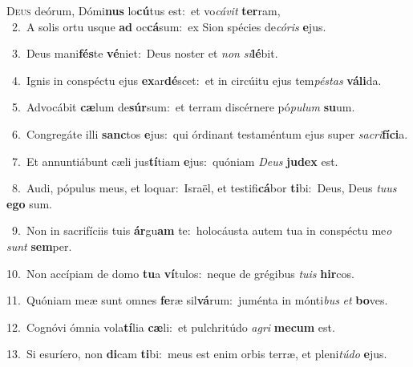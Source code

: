 \lettrine{\initial\textcolor{\initialcolor}{D}}{eus} deórum, Dómi\textbf{nus} lo\-\textbf{cú}\-tus est:~\star et vo\-\textit{cá}\-\textit{vit} \textbf{ter}\-ram,\\
{\numbfont\textcolor{\numbcolor}{~2.}}~A solis ortu usque \textbf{ad} oc\-\textbf{cá}\-sum:~\star ex Sion spécies de\-\textit{có}\-\textit{ris} \textbf{e}\-jus.\par
{\numbfont\textcolor{\numbcolor}{~3.}}~Deus mani\-\textbf{fés}\-te \textbf{vé}\-niet:~\star Deus noster et \textit{non} \textit{si}\-\textbf{lé}bit.\par
{\numbfont\textcolor{\numbcolor}{~4.}}~Ignis in conspéctu ejus \textbf{ex}\-ar\-\textbf{dé}\-scet:~\star et in circúitu ejus tem\-\textit{pés}\-\textit{tas} \textbf{vá}\-\textbf{li}da.\par
{\numbfont\textcolor{\numbcolor}{~5.}}~Advocábit \textbf{cæ}\-lum de\-\textbf{súr}\-sum:~\star et terram discérnere pó\-\textit{pu}\-\textit{lum} \textbf{su}\-um.\par
{\numbfont\textcolor{\numbcolor}{~6.}}~Congregáte illi \textbf{sanc}\-tos \textbf{e}\-jus:~\star qui órdinant testaméntum ejus super \textit{sa}\-\textit{cri}\textbf{fí}\textbf{ci}a.\par
{\numbfont\textcolor{\numbcolor}{~7.}}~Et annuntiábunt cæli jus\-\textbf{tí}\-tiam \textbf{e}\-jus:~\star quóniam \textit{De}\-\textit{us} \textbf{ju}\-\textbf{dex} est.\par
{\numbfont\textcolor{\numbcolor}{~8.}}~Audi, pópulus meus, et loquar:~\dagger Israël, et testifi\-\textbf{cá}\-bor \textbf{ti}\-bi:~\star Deus, Deus \textit{tu}\-\textit{us} \textbf{e}\-\textbf{go} sum.\par
{\numbfont\textcolor{\numbcolor}{~9.}}~Non in sacrifíciis tuis \textbf{ár}\-gu\textbf{am} te:~\star holocáusta autem tua in conspéctu me\textit{o} \textit{sunt} \textbf{sem}\-per.\par
{\numbfont\textcolor{\numbcolor}{10.}}~Non accípiam de domo \textbf{tu}\-a \textbf{ví}\-tulos:~\star neque de grégibus \textit{tu}\-\textit{is} \textbf{hir}\-cos.\par
{\numbfont\textcolor{\numbcolor}{11.}}~Quóniam meæ sunt omnes \textbf{fe}\-ræ sil\-\textbf{vá}\-rum:~\star juménta in mónti\textit{bus} \textit{et} \textbf{bo}\-ves.\par
{\numbfont\textcolor{\numbcolor}{12.}}~Cognóvi ómnia vola\-\textbf{tí}\-lia \textbf{cæ}\-li:~\star et pulchritúdo \textit{a}\-\textit{gri} \textbf{me}\-\textbf{cum} est.\par
{\numbfont\textcolor{\numbcolor}{13.}}~Si esuríero, non \textbf{di}\-cam \textbf{ti}\-bi:~\star meus est enim orbis terræ, et pleni\-\textit{tú}\-\textit{do} \textbf{e}\-jus.\par
